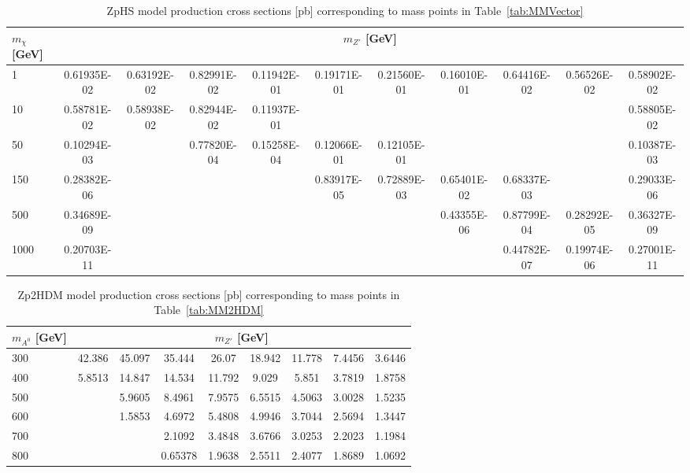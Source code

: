 \begin{table}[htbH]
\begin{center}
\begin{tabular}{l | c | c | c | c | c | c | c | c | c | c}
\hline 
$m_\chi$ [GeV] & \multicolumn{10}{c}{$m_{Z'}$ [GeV]} \\ 
\hline
1 & 0.61935E-02 & 0.63192E-02 & 0.82991E-02 & 0.11942E-01 & 0.19171E-01 & 0.21560E-01 & 0.16010E-01 & 0.64416E-02 & 0.56526E-02 & 0.58902E-02 \\
10 & 0.58781E-02 & 0.58938E-02 & 0.82944E-02 & 0.11937E-01 & & & & & & 0.58805E-02\\
50 & 0.10294E-03 & & 0.77820E-04 & 0.15258E-04  & 0.12066E-01 & 0.12105E-01 & & & & 0.10387E-03 \\
150 & 0.28382E-06 & & & & 0.83917E-05 & 0.72889E-03 & 0.65401E-02 & 0.68337E-03 & & 0.29033E-06 \\
500 & 0.34689E-09 & & & & & & 0.43355E-06 & 0.87799E-04 & 0.28292E-05 & 0.36327E-09 \\
1000 & 0.20703E-11 & & & & & & & 0.44782E-07 & 0.19974E-06 & 0.27001E-11 \\
\hline
\end{tabular}
\caption{ZpHS model production cross sections [pb] corresponding to mass points in Table~\ref{tab:MMVector} \label{tab:zphsxsecs}}
\end{center}
\end{table}

\begin{table}[htbH]
\begin{center}
\begin{tabular}{l | c | c | c | c | c | c | c | c }
\hline 
$m_{A^0}$ [GeV] & \multicolumn{8}{c}{$m_{Z'}$ [GeV]} \\ 
\hline
300 & 42.386 & 45.097 & 35.444 & 26.07 & 18.942 & 11.778 & 7.4456 & 3.6446 \\  
400 & 5.8513 & 14.847 & 14.534 & 11.792 & 9.029 & 5.851 & 3.7819 & 1.8758 \\  
500 & & 5.9605 & 8.4961 & 7.9575 & 6.5515 & 4.5063 & 3.0028 & 1.5235 \\  
600 & & 1.5853 & 4.6972 & 5.4808 & 4.9946 & 3.7044 & 2.5694 & 1.3447 \\
700 & & & 2.1092 & 3.4848 & 3.6766 & 3.0253 & 2.2023 & 1.1984 \\  
800 & & & 0.65378 & 1.9638 & 2.5511 & 2.4077 & 1.8689 & 1.0692 \\  
\hline
\end{tabular}
\caption{Zp2HDM model production cross sections [pb] corresponding to mass points in Table~\ref{tab:MM2HDM} \label{tab:zp2hdmxsecs}}
\end{center}
\end{table}


